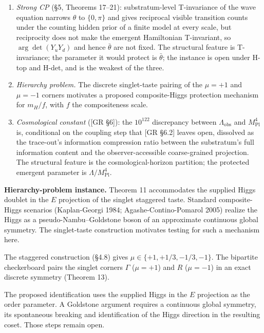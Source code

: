 \documentclass[
]{article}
\begin{document}
\begin{enumerate}
\def\labelenumi{(\roman{enumi})}
\item
  \emph{Strong CP} (§5, Theorems 17--21): substratum-level T-invariance
  of the wave equation narrows \(\theta\) to \(\{0,\pi\}\) and gives
  reciprocal visible transition counts under the counting hidden prior
  of a finite model at every scale, but reciprocity does not make the
  emergent Hamiltonian T-invariant, so \(\arg\det(Y_uY_d)\) and hence
  \(\bar\theta\) are not fixed. The structural feature is T-invariance;
  the parameter it would protect is \(\bar\theta\); the instance is open
  under H-top and H-det, and is the weakest of the three.
\item
  \emph{Hierarchy problem.} The discrete singlet-taste pairing of the
  \(\mu=+1\) and \(\mu=-1\) corners motivates a proposed composite-Higgs
  protection mechanism for \(m_H/f\), with \(f\) the compositeness
  scale.
\item
  \emph{Cosmological constant} ({[}GR §6{]}): the \(10^{122}\)
  discrepancy between \(\Lambda_{\mathrm{obs}}\) and
  \(M_{\mathrm{Pl}}^4\) is, conditional on the coupling step that {[}GR
  §6.2{]} leaves open, dissolved as the trace-out's information
  compression ratio between the substratum's full information content
  and the observer-accessible coarse-grained projection. The structural
  feature is the cosmological-horizon partition; the protected emergent
  parameter is \(\Lambda/M_{\mathrm{Pl}}^4\).
\end{enumerate}

\textbf{Hierarchy-problem instance.} Theorem 11 accommodates the
supplied Higgs doublet in the \(E\) projection of the singlet staggered
taste. Standard composite-Higgs scenarios (Kaplan-Georgi 1984;
Agashe-Contino-Pomarol 2005) realize the Higgs as a
pseudo-Nambu--Goldstone boson of an approximate continuous global
symmetry. The singlet-taste construction motivates testing for such a
mechanism here.

The staggered construction (§4.8) gives
\(\mu \in \{+1, +1/3, -1/3, -1\}\). The bipartite checkerboard pairs the
singlet corners \(\Gamma\) (\(\mu=+1\)) and \(R\) (\(\mu=-1\)) in an
exact discrete symmetry (Theorem 13).

The proposed identification uses the supplied Higgs in the \(E\)
projection as the order parameter. A Goldstone argument requires a
continuous global symmetry, its spontaneous breaking and identification
of the Higgs direction in the resulting coset. Those steps remain open.
\end{document}
